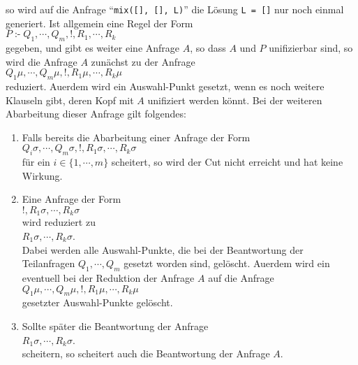 so wird auf die Anfrage  ``\texttt{mix([], [], L)}'' die L\"{o}sung \texttt{L = []} nur noch
einmal generiert.  Ist allgemein eine Regel der Form \\[0.1cm]
\hspace*{1.3cm} $P \;\texttt{:-}\; Q_1, \cdots, Q_m, \texttt{!}, R_1, \cdots, R_k$ \\[0.1cm]
gegeben, und gibt es weiter eine Anfrage $A$, so dass $A$ und $P$  unifizierbar sind, so
wird die Anfrage $A$ zun\"{a}chst zu der Anfrage \\[0.1cm]
\hspace*{1.3cm} $Q_1\mu, \cdots, Q_m\mu, \texttt{!}, R_1\mu, \cdots, R_k\mu$ \\[0.1cm]
reduziert.  Au\3erdem wird ein Auswahl-Punkt gesetzt, wenn es noch weitere Klauseln gibt,
deren Kopf mit $A$ unifiziert werden k\"{o}nnt.
Bei der weiteren Abarbeitung dieser Anfrage gilt folgendes:
\begin{enumerate}
\item Falls bereits die Abarbeitung einer Anfrage der Form \\[0.1cm]
      \hspace*{1.3cm} 
      $Q_i\sigma, \cdots, Q_m\sigma, \texttt{!}, R_1\sigma, \cdots, R_k\sigma$ \\[0.1cm]
      f\"{u}r ein $i\in\{1,\cdots,m\}$ scheitert, so wird der Cut nicht erreicht und hat keine
      Wirkung.
\item Eine Anfrage der Form \\[0.1cm]
      \hspace*{1.3cm} 
      $\texttt{!}, R_1\sigma, \cdots, R_k\sigma$ \\[0.1cm]
      wird reduziert zu \\[0.1cm]
      \hspace*{1.3cm} 
      $R_1\sigma, \cdots, R_k\sigma$. \\[0.1cm]
      Dabei werden alle Auswahl-Punkte, die bei der Beantwortung der Teilanfragen
      $Q_1, \cdots, Q_m$ gesetzt worden sind, gel\"{o}scht.  Au\3erdem wird ein eventuell bei
      der Reduktion der Anfrage $A$ auf die Anfrage \\[0.1cm]
      \hspace*{1.3cm} $Q_1\mu, \cdots, Q_m\mu, \texttt{!}, R_1\mu, \cdots, R_k\mu$
      \\[0.1cm]
      gesetzter Auswahl-Punkte gel\"{o}scht.
\item Sollte sp\"{a}ter die Beantwortung der Anfrage \\[0.1cm]
      \hspace*{1.3cm} $R_1\sigma, \cdots, R_k\sigma$. \\[0.1cm]
      scheitern, so scheitert auch die Beantwortung der Anfrage $A$.
\end{enumerate}
